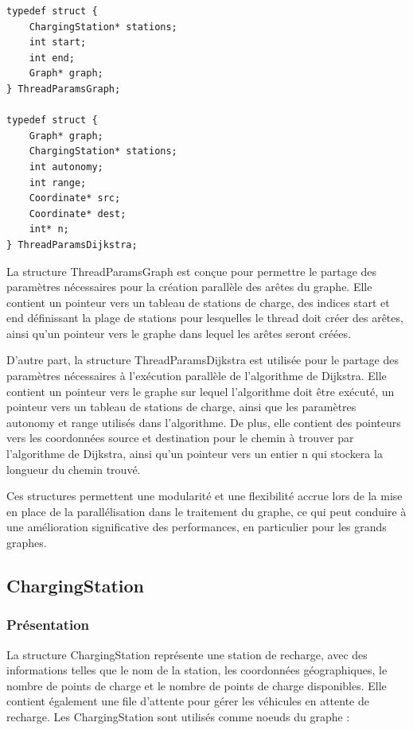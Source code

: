 \documentclass[french,a4paper]{article}
\begin{document}
\begin{center}
    \begin{lstlisting}[caption=Structure Annexes à Graph]
typedef struct {
    ChargingStation* stations;
    int start;
    int end;
    Graph* graph;
} ThreadParamsGraph;

typedef struct {
    Graph* graph;
    ChargingStation* stations;
    int autonomy;
    int range;
    Coordinate* src;
    Coordinate* dest;
    int* n;
} ThreadParamsDijkstra;
\end{lstlisting}
\end{center}

La structure ThreadParamsGraph est conçue pour permettre le partage des paramètres nécessaires pour la création parallèle des arêtes du graphe. Elle contient un pointeur vers un tableau de stations de charge, des indices start et end définissant la plage de stations pour lesquelles le thread doit créer des arêtes, ainsi qu'un pointeur vers le graphe dans lequel les arêtes seront créées.

D'autre part, la structure ThreadParamsDijkstra est utilisée pour le partage des paramètres nécessaires à l'exécution parallèle de l'algorithme de Dijkstra. Elle contient un pointeur vers le graphe sur lequel l'algorithme doit être exécuté, un pointeur vers un tableau de stations de charge, ainsi que les paramètres autonomy et range utilisés dans l'algorithme. De plus, elle contient des pointeurs vers les coordonnées source et destination pour le chemin à trouver par l'algorithme de Dijkstra, ainsi qu'un pointeur vers un entier n qui stockera la longueur du chemin trouvé.

Ces structures permettent une modularité et une flexibilité accrue lors de la mise en place de la parallélisation dans le traitement du graphe, ce qui peut conduire à une amélioration significative des performances, en particulier pour les grands graphes.



\subsection{ChargingStation}

\subsubsection{Présentation}
La structure ChargingStation représente une station de recharge, avec des informations telles que le nom de la station, les coordonnées géographiques, le nombre de points de charge et le nombre de points de charge disponibles. Elle contient également une file d'attente pour gérer les véhicules en attente de recharge. Les ChargingStation sont utilisés comme noeuds du graphe :
\end{document}
